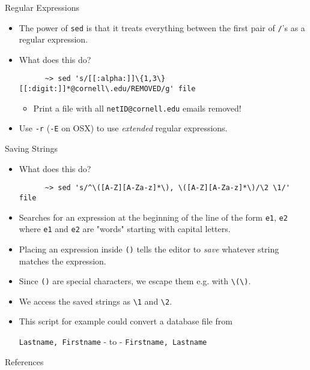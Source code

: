\begin{frame}[fragile]{Regular Expressions}
  \begin{itemize}[<+- | alert@+>]
    \item The power of \texttt{sed} is that it treats everything between the first pair of \texttt{/}'s as a
          regular expression.
    \item What does this do?
    \begin{verbatim}
      ~> sed 's/[[:alpha:]]\{1,3\}[[:digit:]]*@cornell\.edu/REMOVED/g' file
    \end{verbatim}
    \begin{itemize}[<+- | alert@+>]
      \item Print a file with all \texttt{netID@cornell.edu} emails removed!
    \end{itemize}
    \item Use \texttt{-r} (\texttt{-E} on OSX) to use \emph{extended} regular expressions.
  \end{itemize}
\end{frame}

\begin{frame}[fragile]{Saving Strings}
  \begin{itemize}[<+- | alert@+>]
    \item What does this do?
    \begin{verbatim}
      ~> sed 's/^\([A-Z][A-Za-z]*\), \([A-Z][A-Za-z]*\)/\2 \1/' file
    \end{verbatim}
    \item Searches for an expression at the beginning of the line of the form \texttt{e1}, \texttt{e2} where
          \texttt{e1} and \texttt{e2} are "words" starting with capital letters.
    \item Placing an expression inside \texttt{()} tells the editor to \emph{save} whatever string matches
          the expression.
    \item Since \texttt{()} are special characters, we escape them e.g. with \texttt{\textbackslash(\textbackslash)}.
    \item We access the saved strings as \texttt{\textbackslash1} and \texttt{\textbackslash2}.
    \item This script for example could convert a database file from
      \begin{center}
        {\small
          \texttt{Lastname, Firstname} \-- to \-- \texttt{Firstname, Lastname}\\
        }
      \end{center}
  \end{itemize}
\end{frame}

%

\begin{frame}[allowframebreaks]{References}
  
  
\end{frame}


